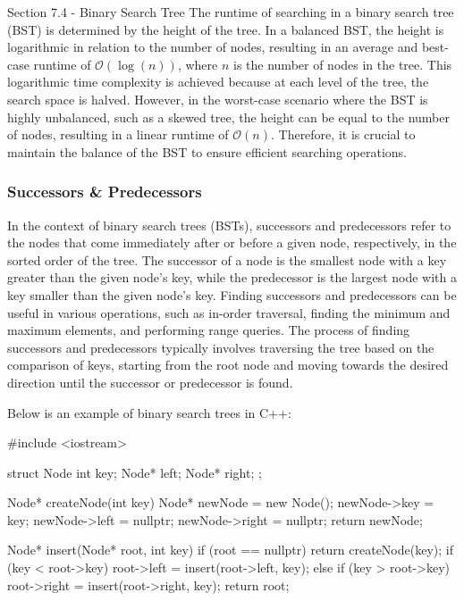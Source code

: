\begin{notes}{Section 7.4 - Binary Search Tree}
    The runtime of searching in a binary search tree (BST) is determined by the height of the tree. In a balanced BST, the height is logarithmic in relation to the number of nodes, resulting in an average and best-case runtime of $\mathcal{O}(\log{(n)})$, where $n$ is the number of nodes in the tree. This logarithmic time complexity is achieved because at 
    each level of the tree, the search space is halved. However, in the worst-case scenario where the BST is highly unbalanced, such as a skewed tree, the height can be equal to the number of nodes, resulting in a linear runtime of $\mathcal{O}(n)$. Therefore, it is crucial to maintain the balance of the BST to ensure efficient searching operations.
    
    \subsubsection*{Successors \& Predecessors}
    
    In the context of binary search trees (BSTs), successors and predecessors refer to the nodes that come immediately after or before a given node, respectively, in the sorted order of the tree. The successor of a node is the smallest node with a key greater than the given node's key, while the predecessor is the largest node 
    with a key smaller than the given node's key. Finding successors and predecessors can be useful in various operations, such as in-order traversal, finding the minimum and maximum elements, and performing range queries. The process of finding successors and predecessors typically involves traversing the tree based on the comparison 
    of keys, starting from the root node and moving towards the desired direction until the successor or predecessor is found.
    
    \begin{highlight}
        Below is an example of binary search trees in C++:
    
    \begin{code}[C++]
    #include <iostream>
    
    struct Node {
        int key;
        Node* left;
        Node* right;
    };
    
    Node* createNode(int key) {
        Node* newNode = new Node();
        newNode->key = key;
        newNode->left = nullptr;
        newNode->right = nullptr;
        return newNode;
    }
    
    Node* insert(Node* root, int key) {
        if (root == nullptr) {
            return createNode(key);
        }
        if (key < root->key) {
            root->left = insert(root->left, key);
        } else if (key > root->key) {
            root->right = insert(root->right, key);
        }
        return root;
    }
    

\end{code}
\end{highlight}
\end{notes}
